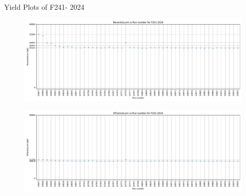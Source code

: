 \begin{frame}{Yield Plots of F241- 2024}
    \begin{figure}
        \centering
        \includegraphics[width=1.0\textwidth]{plots_runwise/NEventsbyLumi_2024_F241.pdf}
    \end{figure}
    \vspace{-0.35cm}
    \begin{figure}
        \centering
        \includegraphics[width=1.0\textwidth]{plots_runwise/NTracksbyLumi_2024_F241.pdf}
    \end{figure}
\end{frame}

